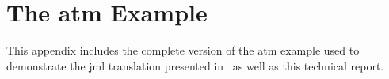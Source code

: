 
\chapter{The \ac{atm} \vsl Example}

This appendix includes the complete version of the \vsl \ac{atm}
example used to demonstrate the \ac{jml} translation presented
in~\cite{Jorgensen&16a} as well as this technical report.




